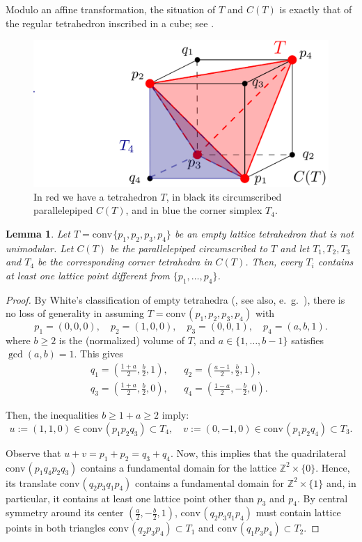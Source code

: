 \documentclass{amsart}
\theoremstyle{plain}
\newtheorem{lemma}[theorem]{Lemma}
\theoremstyle{definition}
\newcommand{\Z}{ \ensuremath{\mathbb{Z}}}
\newcommand{\conv}{\ensuremath{\mathrm{conv}}\hspace{1pt}}
\begin{document}
Modulo an affine transformation, the situation of $T$ and $C(T)$ is exactly that of the regular tetrahedron inscribed in a cube; see . 
%
\begin{figure}[htb]
\includegraphics[scale=.25]{circumscribed_parall}
\caption{In red we have a tetrahedron $T$, in black its circumscribed parallelepiped $C(T)$, and in blue the corner simplex $T_4$.}
\label{fig:circumscribed_parall}
\end{figure}

\begin{lemma}
\label{lemma:corner}
Let $T=\conv\{p_1,p_2,p_3,p_4\}$ be an empty lattice tetrahedron that is not unimodular. Let $C(T)$ be the parallelepiped circumscribed to $T$ and let $T_1, T_2,T_3$ and $T_4$ be the corresponding corner tetrahedra in $C(T)$. Then, every $T_i$ contains at least one lattice point different from $\{p_1,\dots,p_4\}$.
\end{lemma}

\begin{proof}
By White's classification of empty tetrahedra (\cite{White1964}, see also, e.~g.~\cite[Sect.~4.1]{HPPS-survey}), there is no loss of generality in assuming $T=\conv(p_1,p_2,p_3,p_4)$ with
\[
p_1=(0,0,0), \quad
p_2=(1,0,0), \quad
p_3=(0,0,1), \quad
p_4=(a,b,1).
\]
where $b\ge 2$ is the (normalized) volume of $T$, and $a\in \{1,\dots,b-1\}$ satisfies $\gcd(a,b)=1$. This gives 
\begin{align*}
q_1=\left(\frac{1+a}2,\frac{b}2,1\right), &&
q_2=\left(\frac{a-1}2,\frac{b}2,1\right), \quad\\
q_3=\left(\frac{1+a}2,\frac{b}2,0\right), &&
q_4=\left(\frac{1-a}2,-\frac{b}2,0\right).
\end{align*}

Then, the inequalities $b\ge 1+a \ge 2$ imply:
\[
u:=(1,1,0)\in \conv(p_1p_2q_3) \subset T_4, \quad
v:=(0,-1,0)\in \conv(p_1p_2q_4) \subset T_3.
\]

Observe that $u+v=p_1+p_2=q_3+q_4$.
Now, this implies that the quadrilateral $\conv(p_1q_4p_2q_3)$ contains a fundamental domain for the lattice $\Z^2\times\{0\}$. Hence, its translate $\conv(q_2p_3q_1p_4)$ contains a fundamental domain for $\Z^2\times\{1\}$ and, in particular, it contains at least one lattice point other than $p_3$ and $p_4$. By central symmetry around its center $\left(\frac{a}2,-\frac{b}2,1\right)$, $\conv(q_2p_3q_1p_4)$ must contain lattice points in both triangles $\conv(q_2p_3p_4)\subset T_1$ and $\conv(q_1p_3p_4)\subset T_2$.

\end{proof}
\end{document}

